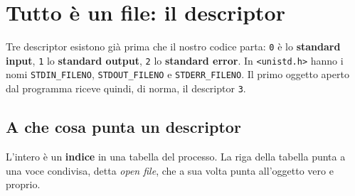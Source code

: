 \section{Tutto è un file: il descriptor}


Tre descriptor esistono già prima che il nostro codice parta: \texttt{0} è lo \textbf{standard input}, \texttt{1} lo
\textbf{standard output}, \texttt{2} lo \textbf{standard error}. In \texttt{<unistd.h>} hanno i nomi
\texttt{STDIN\_FILENO}, \texttt{STDOUT\_FILENO} e \texttt{STDERR\_FILENO}. Il primo oggetto aperto dal programma riceve
quindi, di norma, il descriptor \texttt{3}.

\subsection{A che cosa punta un descriptor}

L'intero è un \textbf{indice} in una tabella del processo. La riga della tabella punta a una voce condivisa, detta
\emph{open file}, che a sua volta punta all'oggetto vero e proprio.

